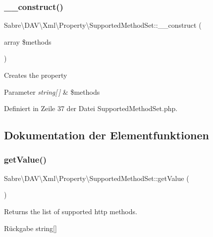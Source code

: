\subsubsection{\texorpdfstring{\+\_\+\+\_\+construct()}{\_\_construct()}}
{\footnotesize\ttfamily Sabre\textbackslash{}\+D\+A\+V\textbackslash{}\+Xml\textbackslash{}\+Property\textbackslash{}\+Supported\+Method\+Set\+::\+\_\+\+\_\+construct (\begin{DoxyParamCaption}\item[{array}]{\$methods }\end{DoxyParamCaption})}

Creates the property


\begin{DoxyParams}{Parameter}
{\em string\mbox{[}$\,$\mbox{]}} & \$methods \\
\hline
\end{DoxyParams}


Definiert in Zeile 37 der Datei Supported\+Method\+Set.\+php.



\subsection{Dokumentation der Elementfunktionen}
\mbox{\label{class_sabre_1_1_d_a_v_1_1_xml_1_1_property_1_1_supported_method_set_af64cedf9514f0e45f2455a7514548c04}} 
\subsubsection{\texorpdfstring{get\+Value()}{getValue()}}
{\footnotesize\ttfamily Sabre\textbackslash{}\+D\+A\+V\textbackslash{}\+Xml\textbackslash{}\+Property\textbackslash{}\+Supported\+Method\+Set\+::get\+Value (\begin{DoxyParamCaption}{ }\end{DoxyParamCaption})}

Returns the list of supported http methods.

\begin{DoxyReturn}{Rückgabe}
string\mbox{[}\mbox{]} 
\end{DoxyReturn}


